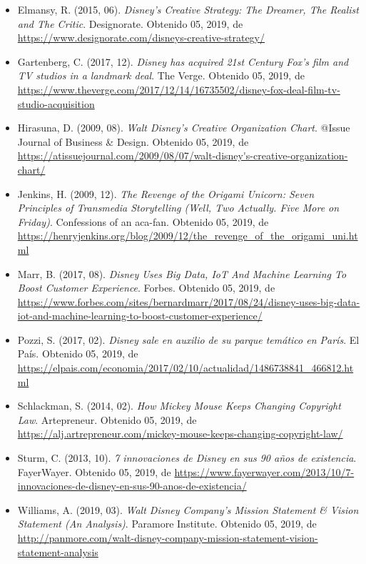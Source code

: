 \begin{itemize}
\item
Elmansy, R. (2015, 06). \textit{Disney’s Creative Strategy: The Dreamer, The Realist and The Critic}. Designorate. Obtenido 05, 2019, de \url{https://www.designorate.com/disneys-creative-strategy/}

\item
Gartenberg, C. (2017, 12). \textit{Disney has acquired 21st Century Fox’s film and TV studios in a landmark deal}. The Verge. Obtenido 05, 2019, de \url{https://www.theverge.com/2017/12/14/16735502/disney-fox-deal-film-tv-studio-acquisition}

\item
Hirasuna, D. (2009, 08). \textit{Walt Disney’s Creative Organization Chart}. @Issue Journal of Business \& Design. Obtenido 05, 2019, de \url{https://atissuejournal.com/2009/08/07/walt-disney's-creative-organization-chart/}

\item
Jenkins, H. (2009, 12). \textit{The Revenge of the Origami Unicorn: Seven Principles of Transmedia Storytelling (Well, Two Actually. Five More on Friday)}. Confessions of an aca-fan. Obtenido 05, 2019, de \url{https://henryjenkins.org/blog/2009/12/the_revenge_of_the_origami_uni.html}

\item
Marr, B. (2017, 08). \textit{Disney Uses Big Data, IoT And Machine Learning To Boost Customer Experience}. Forbes. Obtenido 05, 2019, de \url{https://www.forbes.com/sites/bernardmarr/2017/08/24/disney-uses-big-data-iot-and-machine-learning-to-boost-customer-experience/}

\item
Pozzi, S. (2017, 02). \textit{Disney sale en auxilio de su parque temático en París}. El País. Obtenido 05, 2019, de \url{https://elpais.com/economia/2017/02/10/actualidad/1486738841_466812.html}

\item
Schlackman, S. (2014, 02). \textit{How Mickey Mouse Keeps Changing Copyright Law}. Artepreneur. Obtenido 05, 2019, de \url{https://alj.artrepreneur.com/mickey-mouse-keeps-changing-copyright-law/}

\item
Sturm, C. (2013, 10). \textit{7 innovaciones de Disney en sus 90 años de existencia}. FayerWayer. Obtenido 05, 2019, de \url{https://www.fayerwayer.com/2013/10/7-innovaciones-de-disney-en-sus-90-anos-de-existencia/}

\item
Williams, A. (2019, 03). \textit{Walt Disney Company’s Mission Statement \& Vision Statement (An Analysis)}. Paramore Institute. Obtenido 05, 2019, de \url{http://panmore.com/walt-disney-company-mission-statement-vision-statement-analysis}


\end{itemize}